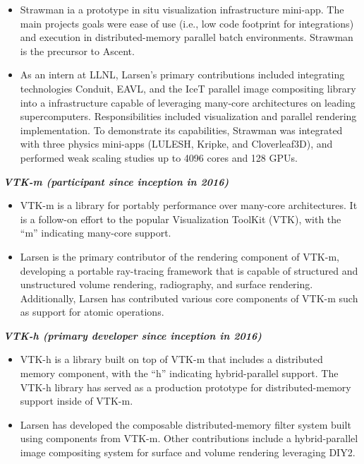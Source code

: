 \documentclass[margin,line]{res}
\begin{document}
\begin{resume}
\begin{itemize}
	\item Strawman ia a prototype in situ visualization infrastructure mini-app. The main projects goals were ease of use (i.e., low code footprint for integrations) and execution in distributed-memory parallel batch environments. Strawman is the precursor to Ascent.
	\item As an intern at LLNL, Larsen's primary contributions included integrating technologies Conduit, EAVL, and the IceT parallel image compositing library into a infrastructure capable of leveraging many-core architectures on leading supercomputers. Responsibilities included visualization and parallel rendering implementation. To demonstrate its capabilities, Strawman was integrated with three physics mini-apps (LULESH, Kripke, and Cloverleaf3D), and performed weak scaling studies up to 4096 cores and 128 GPUs.
\end{itemize}

{\em \textbf{VTK-m (participant since inception in  2016)} }
\begin{itemize}
	\item VTK-m is a library for portably performance over many-core architectures. It is a follow-on effort
	to the popular Visualization ToolKit (VTK), with the “m” indicating many-core support.
	\item Larsen is the primary contributor of the rendering component of VTK-m, developing a portable ray-tracing framework that is capable of structured and unstructured volume rendering, radiography, and surface rendering. Additionally, Larsen has contributed various core components of VTK-m such as support for atomic operations.
\end{itemize}

{\em \textbf{VTK-h (primary developer since inception in  2016)} }
\begin{itemize}
	\item VTK-h is a library built on top of VTK-m that includes a distributed memory component, with the “h” indicating hybrid-parallel support. The VTK-h library has served as a production prototype for distributed-memory support inside of VTK-m.
	\item Larsen has developed the composable distributed-memory filter system built using components from VTK-m. Other contributions include a hybrid-parallel image compositing system for surface and volume rendering leveraging DIY2.
\end{itemize}


\end{resume}
\end{document}
